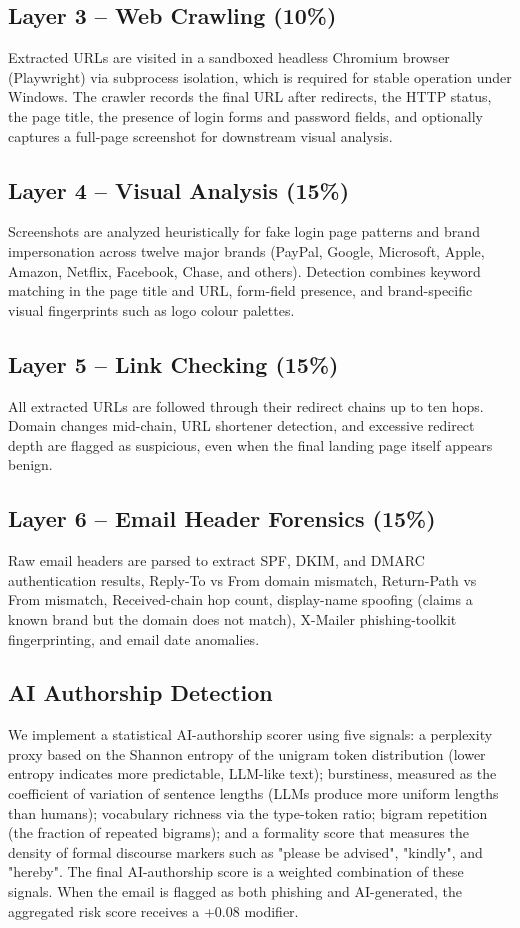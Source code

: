 \documentclass[pdflatex,sn-mathphys-num]{sn-jnl}
\begin{document}
\subsection{Layer 3 -- Web Crawling (10\%)}
Extracted URLs are visited in a sandboxed headless Chromium browser (Playwright) via subprocess isolation, which is required for stable operation under Windows. The crawler records the final URL after redirects, the HTTP status, the page title, the presence of login forms and password fields, and optionally captures a full-page screenshot for downstream visual analysis.

\subsection{Layer 4 -- Visual Analysis (15\%)}
Screenshots are analyzed heuristically for fake login page patterns and brand impersonation across twelve major brands (PayPal, Google, Microsoft, Apple, Amazon, Netflix, Facebook, Chase, and others). Detection combines keyword matching in the page title and URL, form-field presence, and brand-specific visual fingerprints such as logo colour palettes.

\subsection{Layer 5 -- Link Checking (15\%)}
All extracted URLs are followed through their redirect chains up to ten hops. Domain changes mid-chain, URL shortener detection, and excessive redirect depth are flagged as suspicious, even when the final landing page itself appears benign.

\subsection{Layer 6 -- Email Header Forensics (15\%)}
Raw email headers are parsed to extract SPF, DKIM, and DMARC authentication results, Reply-To vs From domain mismatch, Return-Path vs From mismatch, Received-chain hop count, display-name spoofing (claims a known brand but the domain does not match), X-Mailer phishing-toolkit fingerprinting, and email date anomalies.

\subsection{AI Authorship Detection}
We implement a statistical AI-authorship scorer using five signals: a perplexity proxy based on the Shannon entropy of the unigram token distribution (lower entropy indicates more predictable, LLM-like text); burstiness, measured as the coefficient of variation of sentence lengths (LLMs produce more uniform lengths than humans); vocabulary richness via the type-token ratio; bigram repetition (the fraction of repeated bigrams); and a formality score that measures the density of formal discourse markers such as "please be advised", "kindly", and "hereby". The final AI-authorship score is a weighted combination of these signals. When the email is flagged as both phishing and AI-generated, the aggregated risk score receives a +0.08 modifier.
\end{document}
